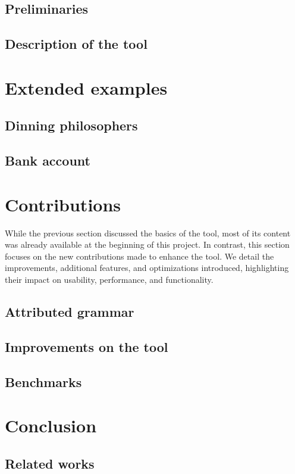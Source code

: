 \documentclass{article}
\theoremstyle{definition}
\theoremstyle{definition}
\begin{document}
\subsection{Preliminaries}


\subsection{Description of the tool}


\section{Extended examples}

\subsection{Dinning philosophers}

\subsection{Bank account}


\section{Contributions}
While the previous section discussed the basics of the tool, most of its  
content was already available at the beginning of this project. In contrast,  
this section focuses on the new contributions made to enhance the  
tool. We detail the improvements, additional features, and  
optimizations introduced, highlighting their impact on usability,  
performance, and functionality.
\subsection{Attributed grammar}


\subsection{Improvements on the tool}


\subsection{Benchmarks}


\section{Conclusion}


\subsection{Related works}


\newpage



\end{document}
